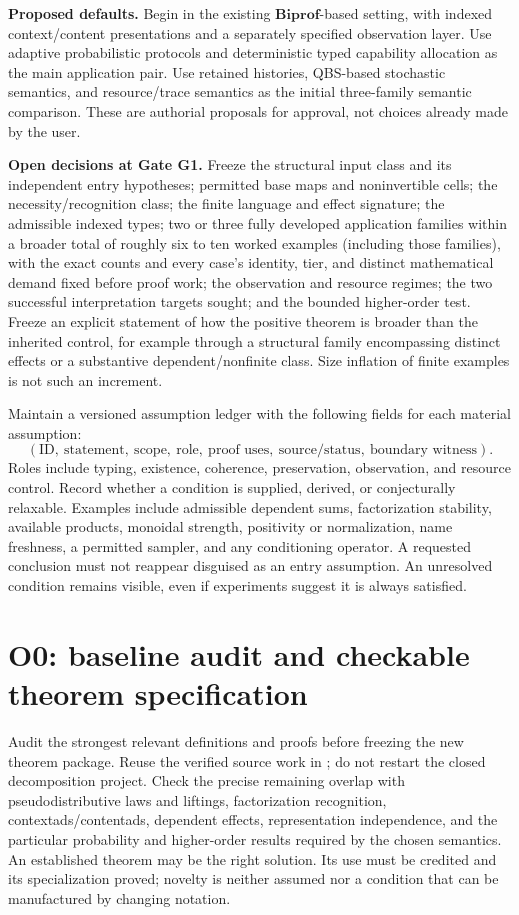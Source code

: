 \documentclass[11pt,a4paper]{article}
\newcommand{\Biprof}{\mathbf{Biprof}}
\begin{document}
\textbf{Proposed defaults.} Begin in the existing \(\Biprof\)-based setting,
with indexed context/content presentations and a separately specified
observation layer. Use adaptive probabilistic protocols and deterministic
typed capability allocation as the main application pair. Use retained
histories, QBS-based stochastic semantics, and resource/trace semantics as
the initial three-family semantic comparison. These are authorial proposals
for approval, not choices already made by the user.

\textbf{Open decisions at Gate G1.} Freeze the structural input class and
its independent entry hypotheses; permitted base maps and noninvertible
cells; the necessity/recognition class; the finite language and effect
signature; the admissible indexed types; two or three fully developed
application families within a broader total of roughly six to ten worked
examples (including those families), with the exact counts and every case's
identity, tier, and distinct mathematical demand fixed before proof work;
the observation and resource regimes; the two successful interpretation
targets sought; and the bounded higher-order test. Freeze an explicit
statement of how the positive theorem is broader than the inherited control,
for example through a structural family encompassing distinct effects or a
substantive dependent/nonfinite class. Size inflation of finite examples is
not such an increment.

Maintain a versioned assumption ledger with the following fields for each
material assumption:
\[
 (\text{ID},\ \text{statement},\ \text{scope},\ \text{role},\
   \text{proof uses},\ \text{source/status},\ \text{boundary witness}).
\]
Roles include typing, existence, coherence, preservation, observation, and
resource control. Record whether a condition is supplied, derived, or
conjecturally relaxable. Examples include admissible dependent sums,
factorization stability, available products, monoidal strength, positivity or
normalization, name freshness, a permitted sampler, and any conditioning
operator. A requested conclusion must not reappear disguised as an entry
assumption. An unresolved condition remains visible, even if experiments
suggest it is always satisfied.

\section{O0: baseline audit and checkable theorem specification}\label{sec:o0}

Audit the strongest relevant definitions and proofs before freezing the new
theorem package. Reuse the verified source work in \cite{Audit,Unified}; do
not restart the closed decomposition project. Check the precise remaining
overlap with pseudodistributive laws and liftings, factorization recognition,
contextads/contentads, dependent effects, representation independence, and
the particular probability and higher-order results required by the chosen
semantics. An established theorem may be the right solution. Its use must be
credited and its specialization proved; novelty is neither assumed nor a
condition that can be manufactured by changing notation.
\end{document}
